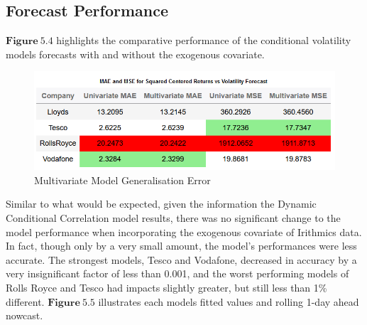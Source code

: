 \subsection{Forecast Performance}
$\mathbf{Figure~5.4}$ highlights the comparative performance of the conditional volatility models forecasts with and without the exogenous covariate. 
\begin{figure}[H]
\centering
\includegraphics[scale=0.45]{images/multiGarch/GenErrorMSEMAE.png}
\caption{Multivariate Model Generalisation Error}
\label{fig: Multivariate Gen Error}
\end{figure}
Similar to what would be expected, given the information the Dynamic Conditional Correlation model results, there was no significant change to the model performance when incorporating the exogenous covariate of Irithmics data. In fact, though only by a very small amount, the model's performances were less accurate. The strongest models, Tesco and Vodafone, decreased in accuracy by a very insignificant factor of less than 0.001, and the worst performing models of Rolls Royce and Tesco had impacts slightly greater, but still less than 1\% different. $\mathbf{Figure~5.5}$ illustrates each models fitted values and rolling 1-day ahead nowcast. 
